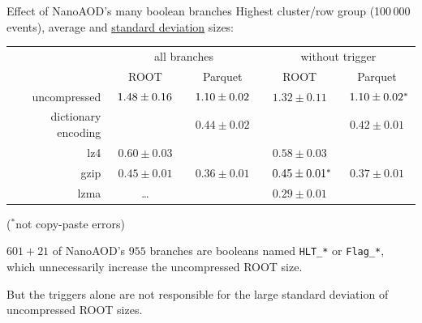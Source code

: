 \documentclass[aspectratio=169]{beamer}
\begin{document}
\begin{frame}{Effect of NanoAOD's many boolean branches}
\vspace{0.25 cm}
Highest cluster/row group (100\,000 events), average and \underline{standard deviation} sizes:

\renewcommand{\arraystretch}{1.2}

\begin{center}
\begin{tabular}{r c c | c c}
                    & \multicolumn{2}{c}{all branches} & \multicolumn{2}{c}{without trigger} \\
                    & ROOT            & Parquet         & ROOT            & Parquet          \\\hline
uncompressed        & $^{\textcolor{white}{*}}1.48 \pm 0.16^{\textcolor{white}{*}}$ & $^{\textcolor{white}{*}}1.10 \pm 0.02^{\textcolor{white}{*}}$ & $1.32 \pm 0.11$ & $^{\textcolor{white}{*}}1.10 \pm 0.02^*$  \\
dictionary encoding &                 & $0.44 \pm 0.02$ &                 & $0.42 \pm 0.01$  \\
lz4                 & $0.60 \pm 0.03$ &                 & $0.58 \pm 0.03$ &                  \\
gzip                & $0.45 \pm 0.01$ & $0.36 \pm 0.01$ & $^{\textcolor{white}{*}}0.45 \pm 0.01^*$ & $0.37 \pm 0.01$  \\
lzma                & \ldots          &                 & $0.29 \pm 0.01$ &                  \\
\end{tabular}
\end{center}

\vspace{-0.1 cm}
\hfill {\scriptsize ($^*$not copy-paste errors)}

\vspace{0.2 cm}
$601+21$ of NanoAOD's $955$ branches are booleans named {\tt\small HLT\_*} or {\tt\small Flag\_*}, which unnecessarily increase the uncompressed ROOT size.

\vspace{0.2 cm}
But the triggers alone are not responsible for the large standard deviation of uncompressed ROOT sizes.
\end{frame}
\end{document}
